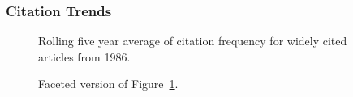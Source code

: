 \documentclass[
  10pt,
  letterpaper,
  DIV=11,
  numbers=noendperiod,
  twoside]{scrartcl}
\begin{document}
\subsubsection*{Citation Trends}\label{citation-trends-10}

\begin{figure}


\caption{\label{fig-citation-spaghetti-1986}Rolling five year average of
citation frequency for widely cited articles from 1986.}

\end{figure}%

\begin{figure}


\caption{\label{fig-citation-facet-1986}Faceted version of
Figure~\ref{fig-citation-spaghetti-1986}.}

\end{figure}%
\end{document}
